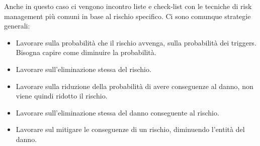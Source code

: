 Anche in questo caso ci vengono incontro liste e check-list con le tecniche di risk
management più comuni in base al rischio specifico. Ci sono comunque strategie generali:
\begin{itemize}
    \item Lavorare sulla probabilità che il rischio avvenga, sulla probabilità dei
          triggers. Bisogna capire come diminuire la probabilità.
    \item Lavorare sull'eliminazione stessa del rischio.
    \item Lavorare sulla riduzione della probabilità di avere conseguenze al danno,
          non viene quindi ridotto il rischio.
    \item Lavorare sull'eliminazione stessa del danno conseguente al rischio.
    \item Lavorare sul mitigare le conseguenze di un rischio, diminuendo l'entità
          del danno.
\end{itemize}

